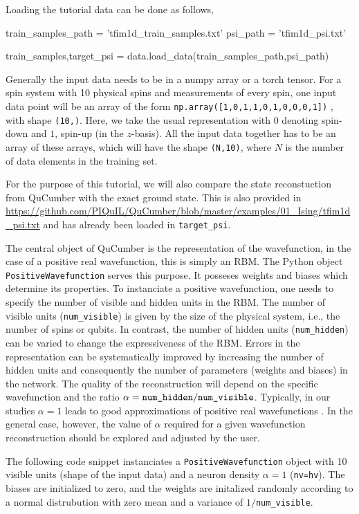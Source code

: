 \documentclass[submission, Phys]{SciPost}
\begin{document}
Loading the tutorial data can be done as follows,

\begin{python}
train_samples_path = 'tfim1d_train_samples.txt'
psi_path           = 'tfim1d_psi.txt'

train_samples,target_psi = data.load_data(train_samples_path,psi_path)
\end{python}

Generally the input data needs to be in a numpy array or a torch tensor.
For a spin system with 10 physical spins and measurements of every spin, one input data point will be an array of the form
\verb|np.array([1,0,1,1,0,1,0,0,0,1])|
, with shape \verb|(10,)|.
Here, we take the usual representation with $0$ denoting spin-down and $1$, spin-up (in the $z$-basis).
All the input data together has to be an array of these arrays, which will have the shape \verb|(N,10)|, where $N$ is the number of data elements in the training set.

For the purpose of this tutorial, we will also compare the state reconstuction from QuCumber with the exact ground state.
This is also provided in \url{https://github.com/PIQuIL/QuCumber/blob/master/examples/01_Ising/tfim1d_psi.txt} and has already been loaded in \verb|target_psi|.

The central object of QuCumber is the representation of the wavefunction, in the case of a positive real wavefunction, this is simply an RBM.
The Python object \verb|PositiveWavefunction| serves this purpose.
It posseses weights and biases which determine its properties.
To instanciate a positive wavefunction, one needs to specify the number of visible and hidden units in the RBM.
The number of visible units (\verb|num_visible|) is given by the size of the physical system, i.e., the number of spins or qubits.
In contrast, the number of hidden units (\verb|num_hidden|) can be varied to change the expressiveness of the RBM.
Errors in the representation can be systematically improved by increasing the number of hidden units and consequently
the number of parameters (weights and biases) in the network.
The quality of the reconstruction will depend on the specific wavefunction and the ratio $\alpha = \verb|num_hidden|/\verb|num_visible|$.
Typically, in our studies $\alpha = 1$ leads to good approximations of positive real wavefunctions \cite{Torlai2016thermo}.
In the general case, however, the value of $\alpha$ required for a given wavefunction reconstruction should be explored and adjusted by the user.

The following code snippet instanciates a \verb|PositiveWavefunction| object with 10 visible units (shape of the input data) and a neuron density $\alpha=1$ (\verb|nv=hv|).
The biases are initialized to zero, and the weights are initalized randomly according to a normal distrubution with zero mean and a variance of $1/$\verb|num_visible|.
\end{document}

